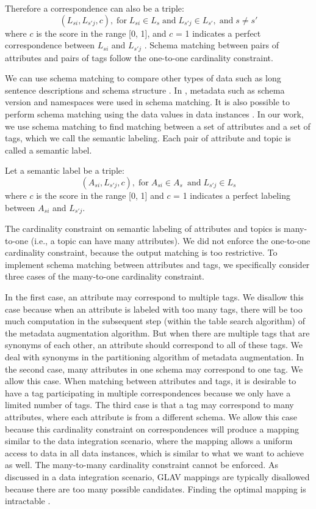 Therefore a correspondence can also be a triple:
\[
(L_{si},L_{s'j},c), \; \textrm{for} \; L_{si}\in L_{s} \; \textrm{and} \; L_{s'j}\in L_{s'}, \; \textrm{and} \; s\neq s'
\]
where $c$ is the score in the range [0, 1], and $c$ = 1 indicates a perfect correspondence between $L_{si}$ and $L_{s'j}$ . Schema matching between pairs of attributes and pairs of tags follow the one-to-one cardinality constraint.

We can use schema matching to compare other types of data such as long sentence descriptions and schema structure \cite{Sorrentino2011NORMS}. In \cite{10.1145/1066157.1066283,Duchateau2009YAM}, metadata such as schema version and namespaces were used in schema matching. It is also possible to perform schema matching using the data values in data instances \cite{Rahm2001Survey}. In our work, we use schema matching to find matching between a set of attributes and a set of tags, which we call the semantic labeling. Each pair of attribute and topic is called a semantic label.

Let a semantic label be a triple:
\[
(A_{si},L_{s'j},c), \; \textrm{for} \; A_{si}\in A_{s}\ \; \textrm{and} \; L_{s'j}\in L_{s}
\]
where $c$ is the score in the range {[}0, 1{]} and $c$ = 1 indicates a perfect labeling between $A_{si}$ and $L_{s'j}$.

The cardinality constraint on semantic labeling of attributes and topics is many-to-one (i.e., a topic can have many attributes). We did not enforce the one-to-one cardinality constraint, because the output matching is too restrictive. To implement schema matching between attributes and tags, we specifically consider three cases of the many-to-one cardinality constraint.

In the first case, an attribute may correspond to multiple tags. We disallow this case because when an attribute is labeled with too many tags, there will be too much computation in the subsequent step (within the table search algorithm) of the metadata augmentation algorithm. But when there are multiple tags that are synonyms of each other, an attribute should correspond to all of these tags. We deal with synonyms in the partitioning algorithm of metadata augmentation. In the second case, many attributes in one schema may correspond to one tag. We allow this case. When matching between attributes and tags, it is desirable to have a tag participating in multiple correspondences because we only have a limited number of tags. The third case is that a tag may correspond to many attributes, where each attribute is from a different schema. We allow this case because this cardinality constraint on correspondences will produce a mapping similar to the data integration scenario, where the mapping allows a uniform access to data in all data instances, which is similar to what we want to achieve as well. The many-to-many cardinality constraint cannot be enforced. As discussed in a data integration scenario, GLAV mappings are typically disallowed because there are too many possible candidates. Finding the optimal mapping is intractable \cite{Ehrig2004QOM}.

